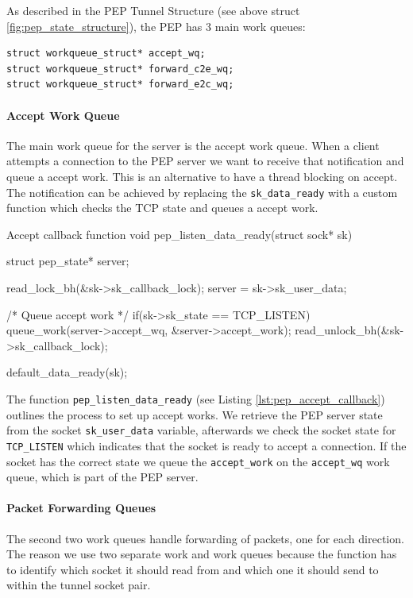 \documentclass[a4paper,english, 11pt]{report}
\begin{document}
As described in the PEP Tunnel Structure (see above struct \ref{fig:pep_state_structure}), the PEP has 3 main work queues:
\begin{verbatim}
struct workqueue_struct* accept_wq;
struct workqueue_struct* forward_c2e_wq;
struct workqueue_struct* forward_e2c_wq;
\end{verbatim}

\paragraph{Accept Work Queue}
The main work queue for the server is the accept work queue. When a client attempts a connection to the PEP server we want to receive that notification and queue a accept work. This is an alternative to have a thread blocking on accept. The notification can be achieved by replacing the \verb|sk_data_ready| with a custom function which checks the TCP state and queues a accept work.\\

\begin{autonumlstlisting}[label=lst:pep_accept_callback]{Accept callback function}
void pep_listen_data_ready(struct sock* sk)
{
	struct pep_state* server;

	read_lock_bh(&sk->sk_callback_lock);
	server = sk->sk_user_data;

	/* Queue accept work */
	if(sk->sk_state == TCP_LISTEN){
		queue_work(server->accept_wq, &server->accept_work);
	}
	read_unlock_bh(&sk->sk_callback_lock);

	default_data_ready(sk);
}
\end{autonumlstlisting}

The function \verb|pep_listen_data_ready| (see Listing \ref{lst:pep_accept_callback}) outlines the process to set up accept works. We retrieve the PEP server state from the socket \verb|sk_user_data| variable, afterwards we check the socket state for \verb|TCP_LISTEN| which indicates that the socket is ready to accept a connection. If the socket has the correct state we queue the \verb|accept_work| on the \verb|accept_wq| work queue, which is part of the PEP server.

\paragraph{Packet Forwarding Queues}\label{sec:forward_queues}
The second two work queues handle forwarding of packets, one for each direction. The reason we use two separate work and work queues because the function has to identify which socket it should read from and which one it should send to within the tunnel socket pair. \\
\end{document}
